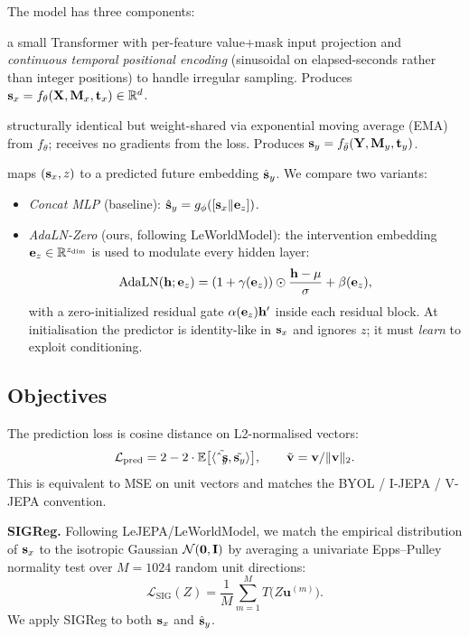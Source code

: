 The model has three components:
\begin{description}[leftmargin=*]
  \item[Context encoder $f_\theta$:] a small Transformer with
  per-feature value+mask input projection and \emph{continuous temporal
  positional encoding} (sinusoidal on elapsed-seconds rather than
  integer positions) to handle irregular sampling. Produces
  $\mathbf{s}_x = f_\theta(\mathbf{X}, \mathbf{M}_x, \mathbf{t}_x) \in \mathbb{R}^{d}$.
  \item[Target encoder $f_{\bar\theta}$:] structurally identical but
  weight-shared via exponential moving average (EMA) from $f_\theta$;
  receives no gradients from the loss. Produces
  $\mathbf{s}_y = f_{\bar\theta}(\mathbf{Y}, \mathbf{M}_y, \mathbf{t}_y)$.
  \item[Predictor $g_\phi$:] maps $(\mathbf{s}_x, z)$ to a predicted future
  embedding $\hat{\mathbf{s}}_y$. We compare two variants:
  \begin{itemize}
    \item \emph{Concat MLP} (baseline): $\hat{\mathbf{s}}_y = g_\phi([\mathbf{s}_x \| \mathbf{e}_z])$.
    \item \emph{AdaLN-Zero} (ours, following LeWorldModel): the
    intervention embedding $\mathbf{e}_z \in \mathbb{R}^{z_{\text{dim}}}$ is used to
    modulate every hidden layer:
    \[
      \mathrm{AdaLN}(\mathbf{h}; \mathbf{e}_z) =
      (1 + \gamma(\mathbf{e}_z))\odot \frac{\mathbf{h} - \mu}{\sigma}
      + \beta(\mathbf{e}_z),
    \]
    with a zero-initialized residual gate
    $\alpha(\mathbf{e}_z) \mathbf{h}^\prime$ inside each residual block. At
    initialisation the predictor is identity-like in $\mathbf{s}_x$ and ignores
    $z$; it must \emph{learn} to exploit conditioning.
  \end{itemize}
\end{description}

\subsection{Objectives}

The prediction loss is cosine distance on L2-normalised vectors:
\[
  \mathcal{L}_{\text{pred}} = 2 - 2 \cdot
  \mathbb{E}\bigl[\langle \tilde{\hat{\mathbf{s}}_y}, \tilde{\mathbf{s}_y} \rangle\bigr],
  \qquad
  \tilde{\mathbf{v}} = \mathbf{v} / \|\mathbf{v}\|_2.
\]
This is equivalent to MSE on unit vectors and matches the BYOL /
I-JEPA / V-JEPA convention.

\textbf{SIGReg.} Following LeJEPA/LeWorldModel, we match the empirical
distribution of $\mathbf{s}_x$ to the isotropic Gaussian $\mathcal{N}(\mathbf{0}, \mathbf{I})$
by averaging a univariate Epps--Pulley normality test over $M{=}1024$
random unit directions:
\[
  \mathcal{L}_{\text{SIG}}(Z) =
  \frac{1}{M} \sum_{m=1}^{M} T\bigl( Z \mathbf{u}^{(m)} \bigr).
\]
We apply SIGReg to both $\mathbf{s}_x$ and $\hat{\mathbf{s}}_y$.

